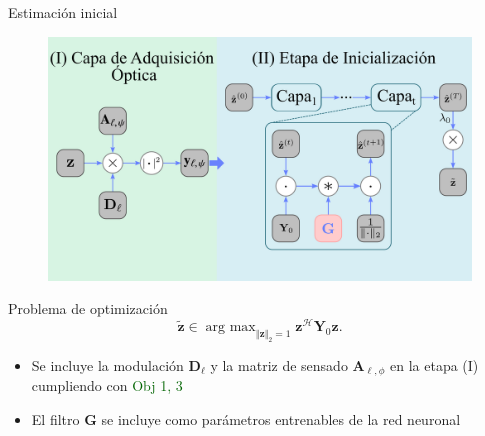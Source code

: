 \documentclass[aspectratio=169,t,xcolor=table]{beamer}
\DeclareMathOperator*{\argmax}{arg \ max} %
\begin{document}
\begin{frame}{Estimación inicial}
\scriptsize
\vspace{-0.5cm}
\begin{figure}
    \centering
    \includegraphics[width=0.6\linewidth]{images/metodología/inicialización.pdf}
\end{figure}
\vspace{-0.5cm}
\begin{block}{\small Problema de optimización}
\vspace{-0.5cm}
\begin{equation}
    \tilde{\mathbf{z}}\in\argmax_{\Vert{\mathbf{z}}\Vert_2=1}{\mathbf{z}}^\mathcal{H}\mathbf{Y}_{0}{\mathbf{z}}.
\end{equation}
\end{block}

\begin{itemize}
        \item Se incluye la modulación $\mathbf{D}_\ell$ y la matriz de sensado $\mathbf{A}_{\ell, \phi}$ en la etapa (I) cumpliendo con \textcolor{DarkGreen}{ Obj 1, 3 \checkmark}
        \item El filtro $\mathbf{G}$ se incluye como parámetros entrenables de la red neuronal
\end{itemize}
\end{frame}
\end{document}
